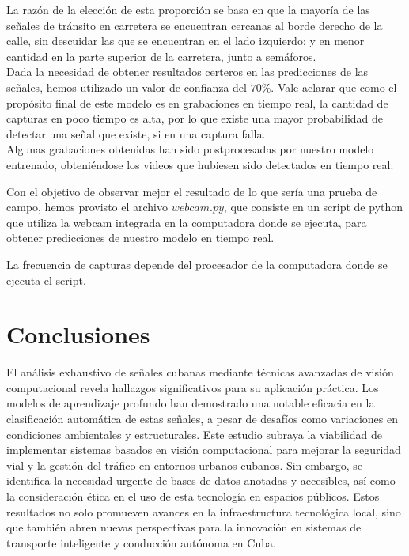 \documentclass{article}
\begin{document}
La razón de la elección de esta proporción se basa en que la mayoría de las señales de tránsito en carretera se encuentran cercanas al borde derecho de la calle, sin descuidar las que se encuentran en el lado izquierdo; y en menor cantidad en la parte superior de la carretera, junto a semáforos.\\
Dada la necesidad de obtener resultados certeros en las predicciones de las señales, hemos utilizado un valor de confianza del $70\%$. Vale aclarar que como el propósito final de este modelo es en grabaciones en tiempo real, la cantidad de capturas en poco tiempo es alta, por lo que existe una mayor probabilidad de detectar una señal que existe, si en una captura falla.\\
Algunas grabaciones obtenidas han sido postprocesadas por nuestro modelo entrenado, obteniéndose los videos que hubiesen sido detectados en tiempo real.

Con el objetivo de observar mejor el resultado de lo que sería una prueba de campo, hemos provisto el archivo $webcam.py$, que consiste en un script de python que utiliza la webcam integrada en la computadora donde se ejecuta, para obtener predicciones de nuestro modelo en tiempo real.

\begin{tcolorbox}
La frecuencia de capturas depende del procesador de la computadora donde se ejecuta el script.
\end{tcolorbox}

\section{Conclusiones}
El análisis exhaustivo de señales cubanas mediante técnicas avanzadas de visión computacional revela hallazgos significativos para su aplicación práctica. Los modelos de aprendizaje profundo han demostrado una notable eficacia en la clasificación automática de estas señales, a pesar de desafíos como variaciones en condiciones ambientales y estructurales. Este estudio subraya la viabilidad de implementar sistemas basados en visión computacional para mejorar la seguridad vial y la gestión del tráfico en entornos urbanos cubanos. Sin embargo, se identifica la necesidad urgente de bases de datos anotadas y accesibles, así como la consideración ética en el uso de esta tecnología en espacios públicos. Estos resultados no solo promueven avances en la infraestructura tecnológica local, sino que también abren nuevas perspectivas para la innovación en sistemas de transporte inteligente y conducción autónoma en Cuba.
\end{document}
